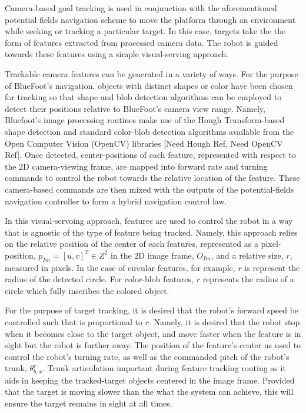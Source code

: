 		Camera-based goal tracking is used in conjunction with the aforementioned potential fields navigation scheme to move the platform through an environment while seeking or tracking a particular target. In this case, targets take the the form of features extracted from processed camera data. The robot is guided towards these features using a simple visual-serving approach. 

Trackable camera features can be generated in a variety of ways. For the purpose of BlueFoot's navigation, objects with distinct shapes or color have been chosen for tracking so that shape and blob detection algorithms can be employed to detect their positions relative to BlueFoot's camera view range. Namely, Bluefoot's image processing routines make use of the Hough Transform-based shape detection and standard color-blob detection algorithms available from the Open Computer Vision (OpenCV) libraries [Need Hough Ref, Need OpenCV Ref]. Once detected, center-positions of each feature, represented with respect to the 2D camera-viewing frame, are mapped into forward rate and turning commands to control the robot towards the relative location of the feature. These camera-based commands are then mixed with the outputs of the potential-fields navigation controller to form a hybrid navigation control law.

In this visual-servoing approach, features are used to control the robot in a way that is agnostic of the type of feature being tracked. Namely, this approach relies on the relative position of the center of each features, represented as a pixel-position, $p_{Im} = [u,v]^{T} \in Z^{2}$ in the 2D image frame, $O_{Im}$, and a relative size, $r$, measured in pixels. In the case of circular features, for example, $r$ is represent the radius of the detected circle. For color-blob features, $r$ represents the radius of a circle which fully inscribes the colored object.

For the purpose of target tracking, it is desired that the robot's forward speed be controlled such that is proportional to $r$. Namely, it is desired that the robot stop when it becomes close to the target object, and move faster when the feature is in sight but the robot is further away. The position of the feature's center us used to control the robot's turning rate, as well as the commanded pitch of the robot's trunk, $\theta_{b,x}^{r}$. Trunk articulation important during feature tracking routing as it aids in keeping the tracked-target objects centered in the image frame. Provided that the target is moving slower than the what the system can achieve, this will ensure the target remains in sight at all times.

